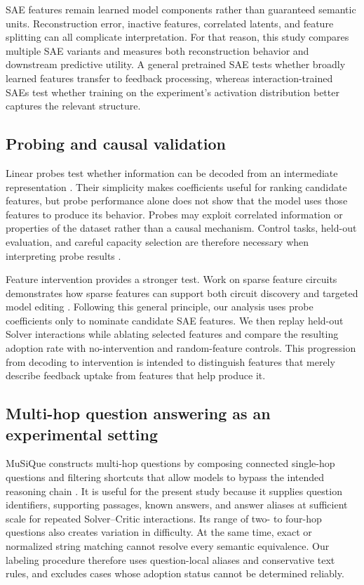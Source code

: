 SAE features remain learned model components rather than guaranteed semantic
units. Reconstruction error, inactive features, correlated latents, and
feature splitting can all complicate interpretation. For that reason, this
study compares multiple SAE variants and measures both reconstruction behavior
and downstream predictive utility. A general pretrained SAE tests whether
broadly learned features transfer to feedback processing, whereas
interaction-trained SAEs test whether training on the experiment's activation
distribution better captures the relevant structure.

\subsection{Probing and causal validation}

Linear probes test whether information can be decoded from an intermediate
representation \cite{alain2016probes}. Their simplicity makes coefficients
useful for ranking candidate features, but probe performance alone does not
show that the model uses those features to produce its behavior. Probes may
exploit correlated information or properties of the dataset rather than a
causal mechanism. Control tasks, held-out evaluation, and careful capacity
selection are therefore necessary when interpreting probe results
\cite{hewitt2019control}.

Feature intervention provides a stronger test. Work on sparse feature
circuits demonstrates how sparse features can support both circuit discovery
and targeted model editing \cite{marks2025circuits}. Following this general
principle, our analysis uses probe coefficients only to nominate candidate SAE
features. We then replay held-out Solver interactions while ablating selected
features and compare the resulting adoption rate with no-intervention and
random-feature controls. This progression from decoding to intervention is
intended to distinguish features that merely describe feedback uptake from
features that help produce it.

\subsection{Multi-hop question answering as an experimental setting}

MuSiQue constructs multi-hop questions by composing connected single-hop
questions and filtering shortcuts that allow models to bypass the intended
reasoning chain \cite{trivedi2022musique}. It is useful for the present study
because it supplies question identifiers, supporting passages, known answers,
and answer aliases at sufficient scale for repeated Solver--Critic
interactions. Its range of two- to four-hop questions also creates variation
in difficulty. At the same time, exact or normalized string matching cannot
resolve every semantic equivalence. Our labeling procedure therefore uses
question-local aliases and conservative text rules, and excludes cases whose
adoption status cannot be determined reliably.
